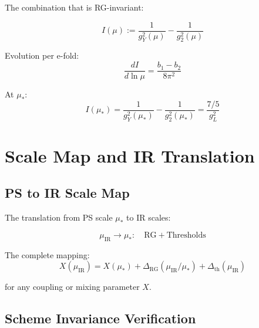 \documentclass[11pt,a4paper]{article}
\begin{document}
The combination that is RG-invariant:

\begin{equation}
\label{eq:invariant-I}
I(\mu) := \frac{1}{g_Y^2(\mu)} - \frac{1}{g_2^2(\mu)}
\end{equation}

Evolution per e-fold:
\begin{equation}
\label{eq:invariant-evolution}
\frac{dI}{d\ln\mu} = \frac{b_1 - b_2}{8\pi^2}
\end{equation}

At $\mu_*$:
\begin{equation}
\label{eq:invariant-at-mustar}
I(\mu_*) = \frac{1}{g_Y^2(\mu_*)} - \frac{1}{g_2^2(\mu_*)} = \frac{7/5}{g_L^2}
\end{equation}

\section{Scale Map and IR Translation}
\label{sec:scale-map}

\subsection{PS to IR Scale Map}
\label{subsec:ps-ir-map}

The translation from PS scale $\mu_*$ to IR scales:

\begin{equation}
\label{eq:scale-map}
\mu_{\text{IR}} \to \mu_* : \quad \text{RG} + \text{Thresholds}
\end{equation}

The complete mapping:
\begin{equation}
\label{eq:complete-map}
X(\mu_{\text{IR}}) = X(\mu_*) + \Delta_{\text{RG}}(\mu_{\text{IR}}/\mu_*) + \Delta_{\text{th}}(\mu_{\text{IR}})
\end{equation}

for any coupling or mixing parameter $X$.

\subsection{Scheme Invariance Verification}
\label{subsec:scheme-invariance}
\end{document}
